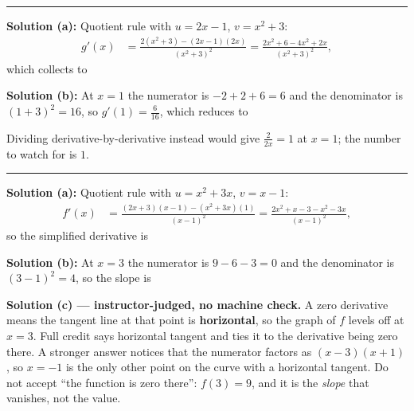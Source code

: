 \documentclass[12pt]{article}
\begin{document}
\vspace{0.15cm}\noindent\rule{\linewidth}{0.2pt}\vspace{0.15cm}


\textbf{Solution (a):} Quotient rule with $u = 2x-1$, $v = x^2+3$:
\begin{align*}
  g'(x) &= \frac{2\left(x^2+3\right) - (2x-1)(2x)}{\left(x^2+3\right)^2}
        = \frac{2x^2 + 6 - 4x^2 + 2x}{\left(x^2+3\right)^2},
\end{align*}
which collects to 

\textbf{Solution (b):} At $x = 1$ the numerator is $-2 + 2 + 6 = 6$ and the
denominator is $(1+3)^2 = 16$, so $g'(1) = \frac{6}{16}$, which reduces to

Dividing derivative-by-derivative instead would give $\frac{2}{2x} = 1$ at
$x = 1$; the number to watch for is $1$.

\vspace{0.15cm}\noindent\rule{\linewidth}{0.2pt}\vspace{0.15cm}


\textbf{Solution (a):} Quotient rule with $u = x^2+3x$, $v = x-1$:
\begin{align*}
  f'(x) &= \frac{(2x+3)(x-1) - \left(x^2+3x\right)(1)}{(x-1)^2}
         = \frac{2x^2 + x - 3 - x^2 - 3x}{(x-1)^2},
\end{align*}
so the simplified derivative is 

\textbf{Solution (b):} At $x = 3$ the numerator is $9 - 6 - 3 = 0$ and the
denominator is $(3-1)^2 = 4$, so the slope is 

\textbf{Solution (c) --- instructor-judged, no machine check.} A zero derivative
means the tangent line at that point is \textbf{horizontal}, so the graph of $f$
levels off at $x = 3$. Full credit says horizontal tangent and ties it to the
derivative being zero there. A stronger answer notices that the numerator
factors as $(x-3)(x+1)$, so $x = -1$ is the only other point on the curve with a
horizontal tangent. Do not accept ``the function is zero there'': $f(3) = 9$, and
it is the \emph{slope} that vanishes, not the value.
\end{document}
